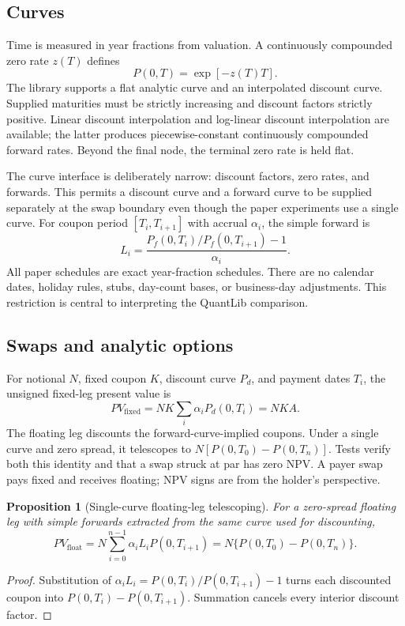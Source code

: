 \documentclass[11pt]{article}
\numberwithin{equation}{section}
\newtheorem{proposition}{Proposition}[section]
\theoremstyle{definition}
\theoremstyle{remark}
\begin{document}
\subsection{Curves}

Time is measured in year fractions from valuation. A continuously compounded
zero rate $z(T)$ defines
\begin{equation}
  P(0,T)=\exp[-z(T)T].
\end{equation}
The library supports a flat analytic curve and an interpolated discount curve.
Supplied maturities must be strictly increasing and discount factors strictly
positive. Linear discount interpolation and log-linear discount interpolation
are available; the latter produces piecewise-constant continuously compounded
forward rates. Beyond the final node, the terminal zero rate is held flat.

The curve interface is deliberately narrow: discount factors, zero rates, and
forwards. This permits a discount curve and a forward curve to be supplied
separately at the swap boundary even though the paper experiments use a single
curve. For coupon period $[T_i,T_{i+1}]$ with accrual $\alpha_i$, the simple
forward is
\begin{equation}
  L_i = \frac{P_f(0,T_i)/P_f(0,T_{i+1})-1}{\alpha_i}.
\end{equation}
All paper schedules are exact year-fraction schedules. There are no calendar
dates, holiday rules, stubs, day-count bases, or business-day adjustments.
This restriction is central to interpreting the QuantLib comparison.

\subsection{Swaps and analytic options}

For notional $N$, fixed coupon $K$, discount curve $P_d$, and payment dates
$T_i$, the unsigned fixed-leg present value is
\begin{equation}
  PV_{\mathrm{fixed}}=N K \sum_i \alpha_i P_d(0,T_i)=NKA.
\end{equation}
The floating leg discounts the forward-curve-implied coupons. Under a single
curve and zero spread, it telescopes to
$N[P(0,T_0)-P(0,T_n)]$. Tests verify both this identity and that a swap struck
at par has zero NPV. A payer swap pays fixed and receives floating; NPV signs
are from the holder's perspective.

\begin{proposition}[Single-curve floating-leg telescoping]
\label{prop:telescoping}
For a zero-spread floating leg with simple forwards extracted from the same
curve used for discounting,
\[
  PV_{\mathrm{float}}
  =N\sum_{i=0}^{n-1}\alpha_i L_iP(0,T_{i+1})
  =N\{P(0,T_0)-P(0,T_n)\}.
\]
\end{proposition}
\begin{proof}
Substitution of
$\alpha_iL_i=P(0,T_i)/P(0,T_{i+1})-1$ turns each discounted coupon into
$P(0,T_i)-P(0,T_{i+1})$. Summation cancels every interior discount factor.
\end{proof}
\end{document}
